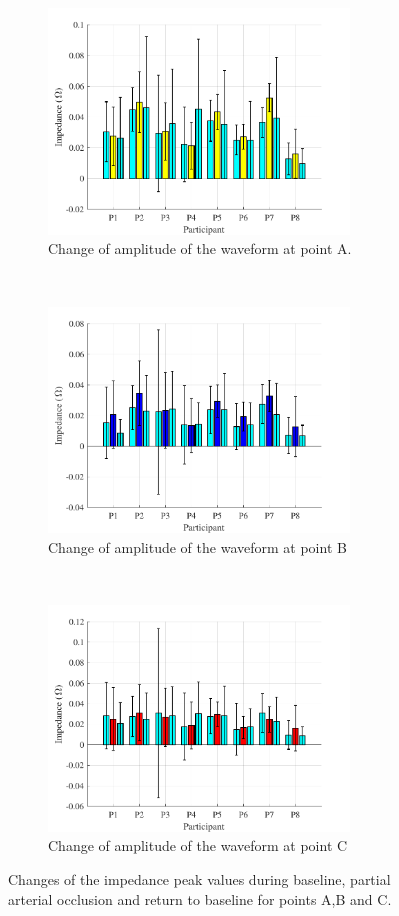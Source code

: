 \begin{figure}[!htbp]
	\centering
	\begin{subfigure}[t]{0.5\textwidth}
		\centering
		\includegraphics[height=6cm,keepaspectratio]{figure9a}    
		\caption{Change of amplitude of the waveform at point A.}
		\label{fig:change_A_arterial}
	\end{subfigure}%
	~ 
	\begin{subfigure}[t]{0.5\textwidth}
		\centering
		\includegraphics[height=6cm,keepaspectratio,keepaspectratio]{figure9b}    
		\caption{Change of amplitude of the waveform at point B}
		\label{fig:change_B_arterial}
	\end{subfigure}
	~
	\begin{subfigure}[t]{0.5\textwidth}
		\centering
		\includegraphics[height=6cm,keepaspectratio]{figure9c}    
		\caption{Change of amplitude of the waveform at point C}
		\label{fig:change_C_arterial}
	\end{subfigure}%
	\caption{Changes of the impedance peak values during baseline, partial arterial occlusion and return to baseline for points A,B and C.}
	\label{fig:iPG_change_points_arterial}
\end{figure}

